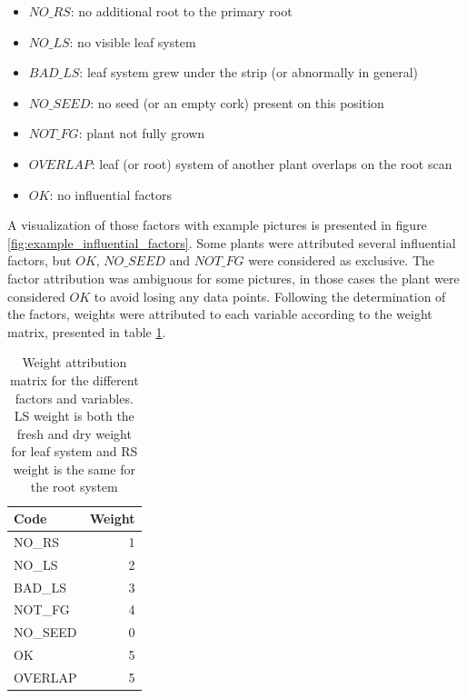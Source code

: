 \begin{itemize}
\item $NO\_RS$: no additional root to the primary root
\item $NO\_LS$: no visible leaf system 
\item $BAD\_LS$: leaf system grew under the strip (or abnormally in general)
\item  $NO\_SEED$: no seed (or an empty cork) present on this position
\item $NOT\_FG$: plant not fully grown
\item $OVERLAP$: leaf (or root) system of another plant overlaps on the root scan
\item $OK$: no influential factors
\end{itemize} 

A visualization of those factors with example pictures is presented in figure \ref{fig:example_influential_factors}. Some plants were attributed several influential factors, but $OK$, $NO\_SEED$ and $NOT\_FG$ were considered as exclusive. The factor attribution was ambiguous for some pictures, in those cases the plant were considered $OK$ to avoid losing any data points.
Following the determination of the factors, weights were attributed to each variable according to the weight matrix, presented in table \ref{tab:weight_attribution_matrix}.


\begin{table}[htbp]
  \centering
  \caption[Weight attribution matrix]{Weight attribution matrix for the different factors and variables. LS weight is both the fresh and dry weight for leaf system and RS weight is the same for the root system}
    \begin{tabular}{lr}
    \toprule
    Code  & Weight \\
    \midrule
    NO\_RS & 1 \\
    NO\_LS & 2   \\
    BAD\_LS & 3  \\
    NOT\_FG & 4 \\
    NO\_SEED & 0\\
    OK 		& 5  \\
    OVERLAP & 5  \\
    \bottomrule
    \end{tabular}%
  \label{tab:weight_attribution_matrix}%
\end{table}%


